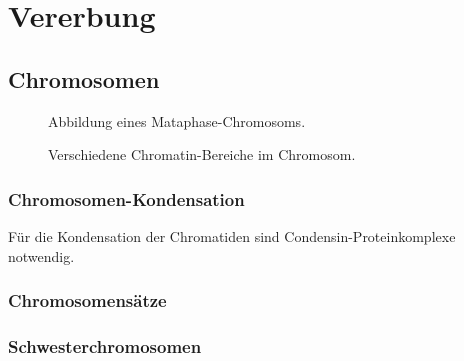 



\section{Vererbung}

\subsection{Chromosomen}

\begin{figure}[H]
    \caption{Abbildung eines Mataphase-Chromosoms.}\label{fig:figurex}
\end{figure}



\begin{figure}[H]
    \caption{Verschiedene Chromatin-Bereiche im Chromosom.}\label{fig:figurexx}
\end{figure}

\subsubsection{Chromosomen-Kondensation}
Für die Kondensation der Chromatiden sind Condensin-Proteinkomplexe notwendig.



\subsubsection{Chromosomensätze}



\subsubsection{Schwesterchromosomen}


